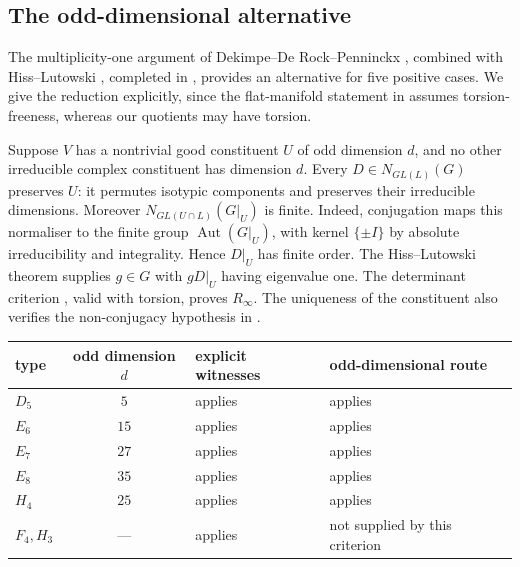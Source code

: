 \documentclass[11pt]{amsart}
\theoremstyle{definition}
\newcommand{\Aut}{\operatorname{Aut}}
\newcommand{\Rinf}{R_\infty}
\begin{document}
\subsection{The odd-dimensional alternative}\label{sec:alternative}

The multiplicity-one argument of Dekimpe--De Rock--Penninckx \cite[Thm.~4.7]{DDP09}, combined with
Hiss--Lutowski \cite[Def.~1.1.3, Thm.~1.1.5]{HL25}, completed in \cite{HL26}, provides an alternative for five positive cases. We give the reduction
explicitly, since the flat-manifold statement in \cite{DDP09} assumes torsion-freeness, whereas our quotients
may have torsion.

Suppose $V$ has a nontrivial good constituent $U$ of odd dimension $d$, and no other irreducible complex
constituent has dimension $d$. Every $D\in N_{GL(L)}(G)$ preserves $U$: it permutes isotypic components
and preserves their irreducible dimensions. Moreover
$N_{GL(U\cap L)}(G|_U)$ is finite. Indeed, conjugation maps this normaliser to the finite group
$\Aut(G|_U)$, with kernel $\{\pm I\}$ by absolute irreducibility and integrality. Hence $D|_U$ has finite
order. The Hiss--Lutowski theorem supplies $g\in G$ with $gD|_U$ having eigenvalue one. The determinant
criterion \cite[Thm.~3.3]{DKT19}, valid with torsion, proves $\Rinf$. The uniqueness of the constituent also
verifies the non-conjugacy hypothesis in \cite[Thm.~4.7]{DDP09}.

\begin{center}\small
\begin{tabular}{lcll}
\toprule
type & odd dimension $d$ & explicit witnesses & odd-dimensional route\\
\midrule
$D_5$ & $5$ & applies & applies\\
$E_6$ & $15$ & applies & applies\\
$E_7$ & $27$ & applies & applies\\
$E_8$ & $35$ & applies & applies\\
$H_4$ & $25$ & applies & applies\\
$F_4,H_3$ & --- & applies & not supplied by this criterion\\
\bottomrule
\end{tabular}
\end{center}
\end{document}
